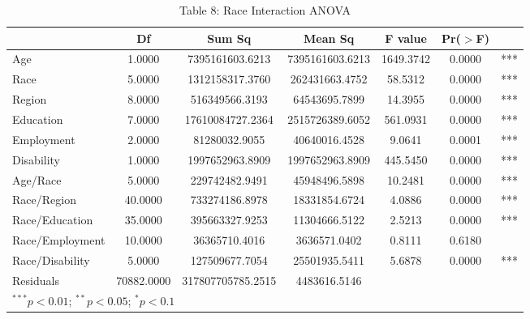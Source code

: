 \documentclass{article}
\begin{document}
\begin{table}[ht]
\centering
\caption*{Table 8: Race Interaction ANOVA}
\begin{tabular}{lcccccr}
  \hline
 & Df & Sum Sq & Mean Sq & F value & Pr($>$F) & \\ 
  \hline
Age & 1.0000 & 7395161603.6213 & 7395161603.6213 & 1649.3742 & 0.0000 & *** \\ 
  Race & 5.0000 & 1312158317.3760 & 262431663.4752 & 58.5312 & 0.0000 & *** \\ 
  Region & 8.0000 & 516349566.3193 & 64543695.7899 & 14.3955 & 0.0000 & *** \\ 
  Education & 7.0000 & 17610084727.2364 & 2515726389.6052 & 561.0931 & 0.0000 & *** \\ 
  Employment & 2.0000 & 81280032.9055 & 40640016.4528 & 9.0641 & 0.0001 & *** \\ 
  Disability & 1.0000 & 1997652963.8909 & 1997652963.8909 & 445.5450 & 0.0000 & *** \\ 
  Age/Race & 5.0000 & 229742482.9491 & 45948496.5898 & 10.2481 & 0.0000 & *** \\ 
  Race/Region & 40.0000 & 733274186.8978 & 18331854.6724 & 4.0886 & 0.0000 & *** \\ 
  Race/Education & 35.0000 & 395663327.9253 & 11304666.5122 & 2.5213 & 0.0000 & *** \\ 
  Race/Employment & 10.0000 & 36365710.4016 & 3636571.0402 & 0.8111 & 0.6180 & \\ 
  Race/Disability & 5.0000 & 127509677.7054 & 25501935.5411 & 5.6878 & 0.0000 &*** \\ 
  Residuals & 70882.0000 & 317807705785.2515 & 4483616.5146 &  &  & \\ 
   \hline
   \multicolumn{6}{l}{\scriptsize{$^{***}p<0.01$; $^{**}p<0.05$; $^{*}p<0.1$}}
\end{tabular}
\end{table}
\end{document}
